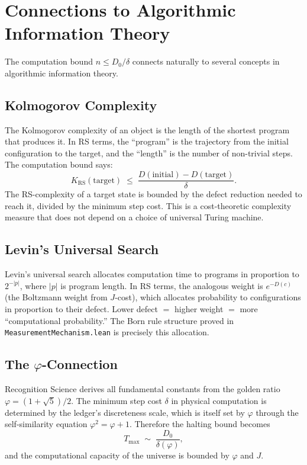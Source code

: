 \documentclass[11pt,a4paper]{article}
\theoremstyle{plain}
\theoremstyle{definition}
\theoremstyle{remark}
\newcommand{\Jcost}{J}
\begin{document}
\section{Connections to Algorithmic Information Theory}\label{sec:ait}

The computation bound $n \le D_0/\delta$ connects naturally to several concepts in algorithmic information theory.

\subsection{Kolmogorov Complexity}

The Kolmogorov complexity of an object is the length of the shortest program that produces it.
In RS terms, the ``program'' is the trajectory from the initial configuration to the target, and the ``length'' is the number of non-trivial steps.
The computation bound says:
\[
K_{\text{RS}}(\text{target}) \;\le\; \frac{D(\text{initial}) - D(\text{target})}{\delta}.
\]
The RS-complexity of a target state is bounded by the defect reduction needed to reach it, divided by the minimum step cost.
This is a cost-theoretic complexity measure that does not depend on a choice of universal Turing machine.

\subsection{Levin's Universal Search}

Levin's universal search allocates computation time to programs in proportion to $2^{-|p|}$, where $|p|$ is program length.
In RS terms, the analogous weight is $e^{-D(c)}$ (the Boltzmann weight from $\Jcost$-cost), which allocates probability to configurations in proportion to their defect.
Lower defect $=$ higher weight $=$ more ``computational probability.''
The Born rule structure proved in \texttt{MeasurementMechanism.lean} is precisely this allocation.

\subsection{The $\varphi$-Connection}

Recognition Science derives all fundamental constants from the golden ratio $\varphi = (1+\sqrt{5})/2$.
The minimum step cost $\delta$ in physical computation is determined by the ledger's discreteness scale, which is itself set by $\varphi$ through the self-similarity equation $\varphi^2 = \varphi + 1$.
Therefore the halting bound becomes
\[
T_{\max} \;\sim\; \frac{D_0}{\delta(\varphi)},
\]
and the computational capacity of the universe is bounded by $\varphi$ and $\Jcost$.
\end{document}
